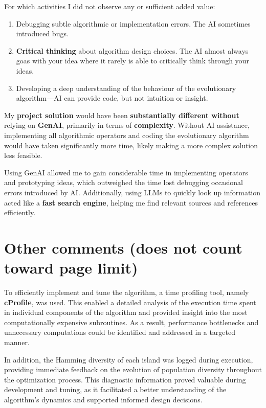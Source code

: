 \documentclass[a4paper,10pt]{article} %
\begin{document}
\noindent
For which activities I did not observe any or sufficient added value:
\begin{enumerate}
 \item Debugging subtle algorithmic or implementation errors. The AI sometimes introduced bugs.  
 \item \textbf{Critical thinking} about algorithm design choices. The AI almost always goas with your idea where it rarely is able to critically think through your ideas.   
 \item Developing a deep understanding of the behaviour of the evolutionary algorithm—AI can provide code, but not intuition or insight.
\end{enumerate}

\noindent
My \textbf{project solution} would have been \textbf{substantially different without} relying on \textbf{GenAI}, primarily in terms of \textbf{complexity}. Without AI assistance, implementing all algorithmic operators and coding the evolutionary algorithm would have taken significantly more time, likely making a more complex solution less feasible. 

\noindent
Using GenAI allowed me to gain considerable time in implementing operators and prototyping ideas, which outweighed the time lost debugging occasional errors introduced by AI. Additionally, using LLMs to quickly look up information acted like a \textbf{fast search engine}, helping me find relevant sources and references efficiently.


\clearpage
\section{Other comments \hfill(does not count toward page limit)} \label{sec_other}
\noindent
To efficiently implement and tune the algorithm, a time profiling tool, namely \textbf{cProfile}, was used. This enabled a detailed analysis of the execution time spent in individual components of the algorithm and provided insight into the most computationally expensive subroutines. As a result, performance bottlenecks and unnecessary computations could be identified and addressed in a targeted manner.

\noindent
In addition, the Hamming diversity of each island was logged during execution, providing immediate feedback on the evolution of population diversity throughout the optimization process. This diagnostic information proved valuable during development and tuning, as it facilitated a better understanding of the algorithm's dynamics and supported informed design decisions.
\end{document}
